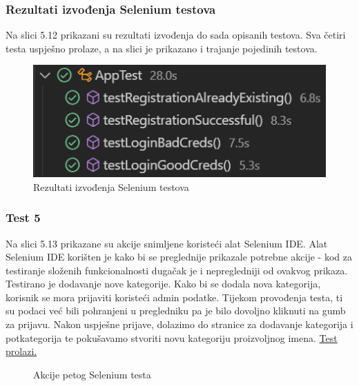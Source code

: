                 \subsubsection{Rezultati izvođenja Selenium testova}
                Na slici 5.12 prikazani su rezultati izvođenja do sada opisanih testova. Sva četiri testa uspješno prolaze, a na slici je prikazano i trajanje pojedinih testova.

                \begin{figure}[H]
				\includegraphics[]{slike/selenium_results.png}
				\centering
				\caption{Rezultati izvođenja Selenium testova}
				\label{fig:seleniumResults}
			\end{figure}

                \eject

                \subsubsection{Test 5}
                Na slici 5.13 prikazane su akcije snimljene koristeći alat Selenium IDE. Alat Selenium IDE korišten je kako bi se preglednije prikazale potrebne akcije - kod za testiranje složenih funkcionalnosti dugačak je i nepregledniji od ovakvog prikaza. Testirano je dodavanje nove kategorije. Kako bi se dodala nova kategorija, korisnik se mora prijaviti koristeći admin podatke. Tijekom provođenja testa, ti su podaci već bili pohranjeni u pregledniku pa je bilo dovoljno kliknuti na gumb za prijavu. Nakon uspješne prijave, dolazimo do stranice za dodavanje kategorija i potkategorija te pokušavamo stvoriti novu kategoriju proizvoljnog imena. \underline{Test prolazi.}

                \begin{figure}[H]
				\centering
				\caption{Akcije petog Selenium testa}
				\label{fig:selenium4}
			\end{figure}

